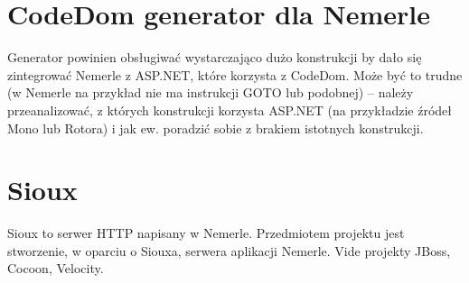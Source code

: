 \documentclass{article}
\begin{document}
\section{CodeDom generator dla Nemerle}

Generator powinien obsługiwać wystarczająco dużo konstrukcji by dało się zintegrować 
Nemerle z ASP.NET, które korzysta z CodeDom. Może być to trudne (w Nemerle na
przykład nie ma instrukcji GOTO lub podobnej) -- należy przeanalizować, z których
konstrukcji korzysta ASP.NET (na przykładzie źródeł Mono lub Rotora) i jak ew.
poradzić sobie z brakiem istotnych konstrukcji.


\section{Sioux}

Sioux to serwer HTTP napisany w Nemerle. Przedmiotem projektu jest
stworzenie, w oparciu o Siouxa, serwera aplikacji Nemerle. Vide projekty
JBoss, Cocoon, Velocity.
\end{document}
